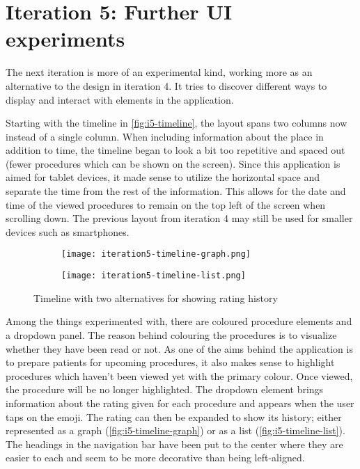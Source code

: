 \section{Iteration 5: Further UI experiments}
\label{sec:iteration5}

The next iteration is more of an experimental kind, working more as an alternative to the design in iteration 4. It tries to discover different ways to display and interact with elements in the application.

Starting with the timeline in \autoref{fig:i5-timeline}, the layout spans two columns now instead of a single column. When including information about the place in addition to time, the timeline began to look a bit too repetitive and spaced out (fewer procedures which can be shown on the screen). Since this application is aimed for tablet devices, it made sense to utilize the horizontal space and separate the time from the rest of the information. This allows for the date and time of the viewed procedures to remain on the top left of the screen when scrolling down. The previous layout from iteration 4 may still be used for smaller devices such as smartphones.

\begin{sidewaysfigure}
    \centering
    \hspace{\fill}
    \begin{subfigure}{0.4\textwidth}
        \centering
        \texttt{[image: iteration5-timeline-graph.png]}
        \label{fig:i5-timeline-graph}
    \end{subfigure}
    \hspace{\fill}
    \begin{subfigure}{0.4\textwidth}
        \centering
        \texttt{[image: iteration5-timeline-list.png]}
        \label{fig:i5-timeline-list}
    \end{subfigure}
    \hspace*{\fill}
    \caption{Timeline with two alternatives for showing rating history}
    \label{fig:i5-timeline}
\end{sidewaysfigure}

Among the things experimented with, there are coloured procedure elements and a dropdown panel. The reason behind colouring the procedures is to visualize whether they have been read or not. As one of the aims behind the application is to prepare patients for upcoming procedures, it also makes sense to highlight procedures which haven't been viewed yet with the primary colour. Once viewed, the procedure will be no longer highlighted. The dropdown element brings information about the rating given for each procedure and appears when the user taps on the emoji. The rating can then be expanded to show its history; either represented as a graph (\autoref{fig:i5-timeline-graph}) or as a list (\autoref{fig:i5-timeline-list}). The headings in the navigation bar have been put to the center where they are easier to each and seem to be more decorative than being left-aligned.

